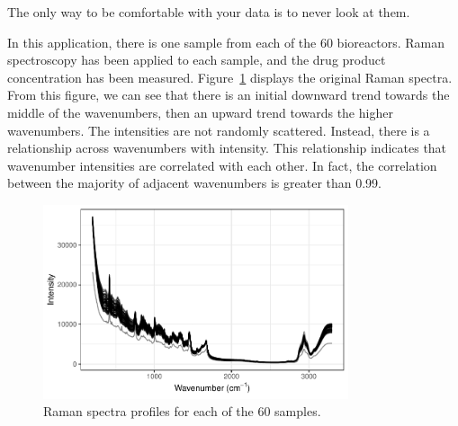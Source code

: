 \documentclass[
  letterpaper,
  DIV=11,
  numbers=noendperiod]{scrartcl}
\begin{document}
\begin{tcolorbox}[enhanced jigsaw, title=\textcolor{quarto-callout-important-color}{\faExclamation}\hspace{0.5em}{\textbf{WTF} \#4}, rightrule=.15mm, leftrule=.75mm, bottomtitle=1mm, opacityback=0, opacitybacktitle=0.6, bottomrule=.15mm, arc=.35mm, colframe=quarto-callout-important-color-frame, breakable, toprule=.15mm, toptitle=1mm, colback=white, titlerule=0mm, coltitle=black, left=2mm, colbacktitle=quarto-callout-important-color!10!white]

The only way to be comfortable with your data is to never look at them.

\end{tcolorbox}

In this application, there is one sample from each of the 60
bioreactors. Raman spectroscopy has been applied to each sample, and the
drug product concentration has been measured.
Figure~\ref{fig-raman-spectra} displays the original Raman spectra. From
this figure, we can see that there is an initial downward trend towards
the middle of the wavenumbers, then an upward trend towards the higher
wavenumbers. The intensities are not randomly scattered. Instead, there
is a relationship across wavenumbers with intensity. This relationship
indicates that wavenumber intensities are correlated with each other. In
fact, the correlation between the majority of adjacent wavenumbers is
greater than 0.99.

\begin{figure}[t!]

{\centering \includegraphics[width=0.8\textwidth,height=\textheight]{figures/fig-raman-spectra-1.pdf}

}

\caption{\label{fig-raman-spectra}Raman spectra profiles for each of the
60 samples.}

\end{figure}
\end{document}
